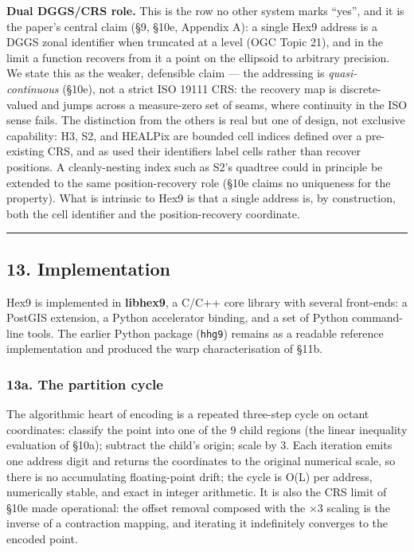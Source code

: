 \documentclass[
  11pt,
  a4paper,
]{article}
\begin{document}
\textbf{Dual DGGS/CRS role.} This is the row no other system marks
``yes'', and it is the paper's central claim (§9, §10e, Appendix A): a
single Hex9 address is a DGGS zonal identifier when truncated at a level
(OGC Topic 21), and in the limit a function recovers from it a point on
the ellipsoid to arbitrary precision. We state this as the weaker,
defensible claim --- the addressing is \emph{quasi-continuous} (§10e),
not a strict ISO 19111 CRS: the recovery map is discrete-valued and
jumps across a measure-zero set of seams, where continuity in the ISO
sense fails. The distinction from the others is real but one of design,
not exclusive capability: H3, S2, and HEALPix are bounded cell indices
defined over a pre-existing CRS, and as used their identifiers label
cells rather than recover positions. A cleanly-nesting index such as
S2's quadtree could in principle be extended to the same
position-recovery role (§10e claims no uniqueness for the property).
What is intrinsic to Hex9 is that a single address is, by construction,
both the cell identifier and the position-recovery coordinate.

\begin{center}\rule{0.5\linewidth}{0.5pt}\end{center}

\subsection{13. Implementation}\label{implementation}

Hex9 is implemented in \textbf{libhex9}, a C/C++ core library with
several front-ends: a PostGIS extension, a Python accelerator binding,
and a set of Python command-line tools. The earlier Python package
(\texttt{hhg9}) remains as a readable reference implementation and
produced the warp characterisation of §11b.

\subsubsection{13a. The partition cycle}\label{a.-the-partition-cycle}

The algorithmic heart of encoding is a repeated three-step cycle on
octant coordinates: classify the point into one of the 9 child regions
(the linear inequality evaluation of §10a); subtract the child's origin;
scale by 3. Each iteration emits one address digit and returns the
coordinates to the original numerical scale, so there is no accumulating
floating-point drift; the cycle is O(L) per address, numerically stable,
and exact in integer arithmetic. It is also the CRS limit of §10e made
operational: the offset removal composed with the ×3 scaling is the
inverse of a contraction mapping, and iterating it indefinitely
converges to the encoded point.
\end{document}
